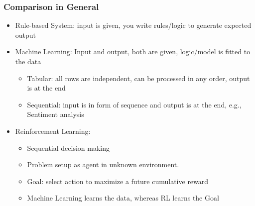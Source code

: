 \begin{frame}[fragile]\frametitle{Comparison in General}

\begin{itemize}
\item Rule-based System: input is given, you write rules/logic to generate expected output
\item Machine Learning: Input and output, both are given, logic/model is fitted to the data
	\begin{itemize}
	\item Tabular: all rows are independent, can be processed in any order, output is at the end
	\item Sequential: input is in form of sequence and output is at the end, e.g., Sentiment analysis
	\end{itemize}
\item Reinforcement Learning: 
	\begin{itemize}
	\item Sequential decision making 
	\item Problem setup as agent in unknown environment. 
	\item Goal: select action to maximize a future cumulative reward
	\item Machine Learning learns the data, whereas RL learns the Goal
	\end{itemize}
\end{itemize}

\end{frame}




